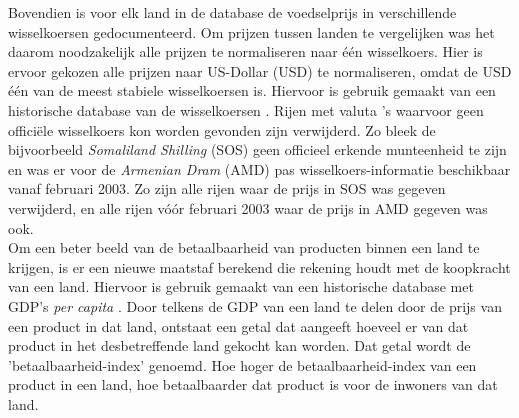 \documentclass{article}
\begin{document}
 

Bovendien is voor elk land in de database de voedselprijs in verschillende wisselkoersen gedocumenteerd. Om prijzen tussen landen te vergelijken was het daarom noodzakelijk alle prijzen te normaliseren naar één wisselkoers. Hier is ervoor gekozen alle prijzen naar US-Dollar (USD) te normaliseren, omdat de USD één van de meest stabiele wisselkoersen is. Hiervoor is gebruik gemaakt van een historische database van de wisselkoersen \cite{curr_rate}. Rijen met valuta 's waarvoor geen officiële wisselkoers kon worden gevonden zijn verwijderd. Zo bleek de bijvoorbeeld \textit{Somaliland Shilling} (SOS)  geen officieel erkende munteenheid te zijn en was er voor de \textit{Armenian Dram} (AMD) pas wisselkoers-informatie beschikbaar vanaf februari 2003. Zo zijn alle rijen waar de prijs in SOS was gegeven verwijderd, en alle rijen vóór februari 2003 waar de prijs in AMD gegeven was ook.\\

Om een beter beeld van de betaalbaarheid van producten binnen een land te krijgen, is er een nieuwe maatstaf berekend die rekening houdt met de koopkracht van een land. Hiervoor is gebruik gemaakt van een historische database met GDP's \textit{per capita} \cite{GDP}. 
Door telkens de GDP van een land te delen door de prijs van een product in dat land, ontstaat een getal dat aangeeft hoeveel er van dat product in het desbetreffende land gekocht kan worden. Dat getal wordt de 'betaalbaarheid-index' genoemd. Hoe hoger de betaalbaarheid-index van een product in een land, hoe betaalbaarder dat product is voor de inwoners van dat land.\\ %
\end{document}
